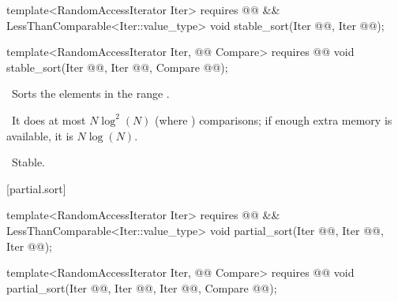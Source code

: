 \documentclass[american,twoside]{book}
\begin{document}
\begin{paras}
%
\color{addclr}\begin{itemdecl}
template<RandomAccessIterator Iter>
  requires @@ &&
           LessThanComparable<Iter::value_type> 
  void stable_sort(Iter @@, Iter @@);

template<RandomAccessIterator Iter, @@ Compare>
  requires @@
  void stable_sort(Iter @@, Iter @@,
                   Compare @@);
\end{itemdecl}\color{black}

\begin{itemdescr}
\pnum
\effects\ 
Sorts the elements in the range .

\pnum
{}

\pnum
\complexity\ 
It does at most $N \log^2(N)$
(where
)
comparisons; if enough extra memory is available, it is
$N \log(N)$.

\pnum
\notes\ 
Stable.
\end{itemdescr}

[partial.sort]{}

%
\color{addclr}\begin{itemdecl}
template<RandomAccessIterator Iter>
  requires @@ &&
           LessThanComparable<Iter::value_type>
  void partial_sort(Iter @@,
                    Iter @\farg{middle}@,
                    Iter @\farg{last}@);

template<RandomAccessIterator Iter, @@ Compare>
  requires @@
  void partial_sort(Iter @@,
                    Iter @\farg{middle}@,
                    Iter @\farg{last}@,
                    Compare @\farg{comp}@);
\end{itemdecl}\color{black}


\end{paras}
\end{document}
